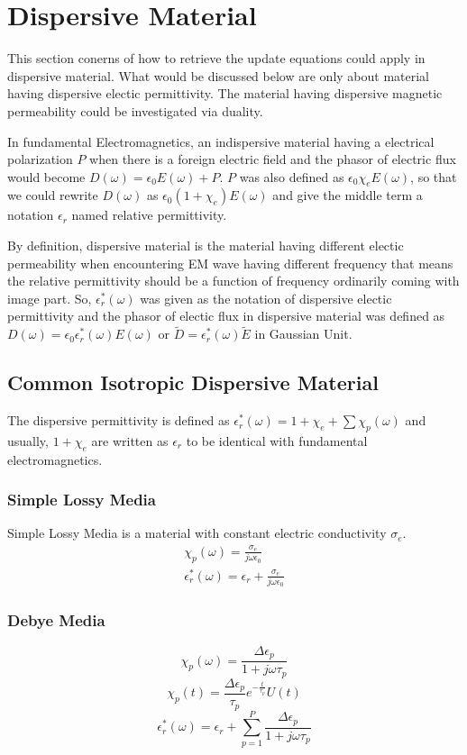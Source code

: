 \section{Dispersive Material}
\label{sec:dispersive}
This section conerns of how to retrieve the update equations could apply in dispersive material. What would be discussed
below are only about material having dispersive electic permittivity. The material having dispersive magnetic
permeability could be investigated via duality.

In fundamental Electromagnetics, an indispersive material having a electrical polarization $P$ when there is a foreign
electric field and the phasor of electric flux would become $D(\omega) = \epsilon_0 E(\omega) + P$. $P$ was also defined
as $\epsilon_0 \chi_e E(\omega)$, so that we could rewrite $D(\omega)$ as $\epsilon_0 (1+\chi_e)E(\omega)$ and give the middle term a notation
$\epsilon_r$ named relative permittivity.

By definition, dispersive material is the material having different electic permeability when encountering EM wave
having different frequency that means the relative permittivity should be a function of frequency ordinarily coming with
image part. So, $\epsilon_r^*(\omega)$ was given as the notation of dispersive electic permittivity and the phasor of
electic flux in dispersive material was defined as $D(\omega) = \epsilon_0 \epsilon_r^*(\omega)E(\omega)$ or
$\widetilde{D} = \epsilon_r^*(\omega)\widetilde{E}$ in Gaussian Unit.
\subsection{Common Isotropic Dispersive Material}
The dispersive permittivity is defined as $\epsilon_r^*(\omega) = 1 + \chi_e + \sum \chi_p(\omega)$ and usually, $1 +
\chi_e$ are written as $\epsilon_r$ to be identical with fundamental electromagnetics.
\subsubsection{Simple Lossy Media}
Simple Lossy Media is a material with constant electric conductivity $\sigma_e$.
\begin{gather}
  \chi_p(\omega) = \frac{\sigma_e}{j\omega\epsilon_0}\\
  \epsilon_r^*(\omega) = \epsilon_r + \frac{\sigma_e}{j\omega\epsilon_0}
\end{gather}

\subsubsection{Debye Media}
\begin{equation}
  \chi_p(\omega) = \frac{\Delta\epsilon_p}{1+j\omega\tau_p}  
\end{equation}
\begin{equation}
  \chi_p(t) = \frac{\Delta \epsilon_p}{\tau_p} e^{-\frac{t}{\tau_p}}U(t)  
\end{equation}
\begin{equation}
  \epsilon_r^*(\omega) = \epsilon_r + \sum_{p=1}^P \frac{\Delta\epsilon_p}{1+j\omega\tau_p}  
\end{equation}



